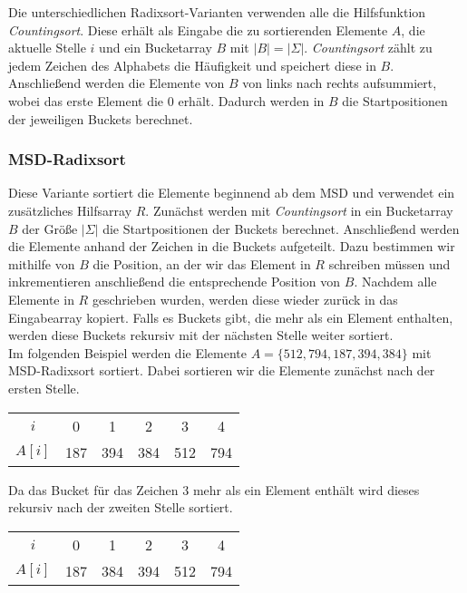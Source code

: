 Die unterschiedlichen Radixsort-Varianten verwenden alle die Hilfsfunktion \emph{Countingsort}. Diese erhält als Eingabe die zu sortierenden Elemente $A$, die aktuelle Stelle $i$ und ein Bucketarray $B$ mit $|B| = |\Sigma|$. \emph{Countingsort} zählt zu jedem Zeichen des Alphabets die Häufigkeit und speichert diese in $B$. Anschließend werden die Elemente von $B$ von links nach rechts aufsummiert, wobei das erste Element die $0$ erhält. Dadurch werden in $B$ die Startpositionen der jeweiligen Buckets berechnet. \\


\subsubsection{MSD-Radixsort}
\label{sort:radix:msd}

Diese Variante sortiert die Elemente beginnend ab dem MSD und verwendet ein zusätzliches Hilfsarray $R$. Zunächst werden mit \emph{Countingsort} in ein Bucketarray $B$ der Größe $|\Sigma|$ die Startpositionen der Buckets berechnet. Anschließend werden die Elemente anhand der Zeichen in die Buckets aufgeteilt. Dazu bestimmen wir mithilfe von $B$ die Position, an der wir das Element in $R$ schreiben müssen und inkrementieren anschließend die entsprechende Position von $B$.
Nachdem alle Elemente in $R$ geschrieben wurden, werden diese wieder zurück in das Eingabearray kopiert. Falls es Buckets gibt, die mehr als ein Element enthalten, werden diese Buckets rekursiv mit der nächsten Stelle weiter sortiert. \\

Im folgenden Beispiel werden die Elemente $A=\{512, 794, 187, 394, 384\}$ mit MSD-Radixsort sortiert. Dabei sortieren wir die Elemente zunächst nach der ersten Stelle. 

\begin{table}[H]
	\centering
	\begin{tabular}{c|| c | c c | c | c }
		$i$ & 0 & 1 & 2 & 3 & 4 \\
		$A[i]$ & 187 & 394 & 384 & 512 & 794
	\end{tabular}
	\label{tab:radix:msd:step_1}
\end{table}

Da das Bucket für das Zeichen $3$ mehr als ein Element enthält wird dieses rekursiv nach der zweiten Stelle sortiert.

\begin{table}[H]
	\centering
	\begin{tabular}{c|| c | c | c | c | c }
		$i$ & 0 & 1 & 2 & 3 & 4 \\
		$A[i]$ & 187 & 384 & 394 & 512 & 794
	\end{tabular}
	\label{tab:radix:msd:step_2}
\end{table}

